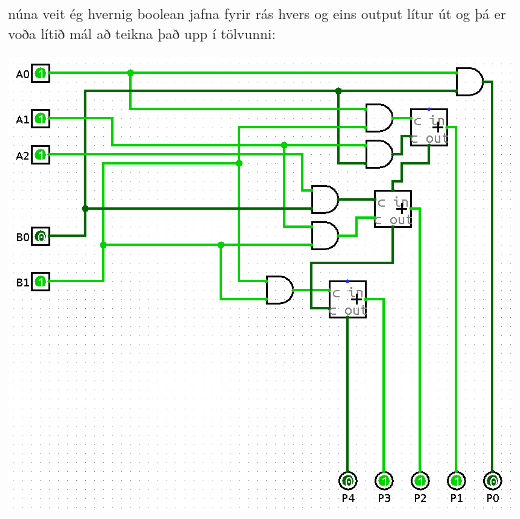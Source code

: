 \documentclass{article}
\begin{document}
núna veit ég hvernig boolean jafna fyrir rás hvers og eins output lítur út og þá er voða lítið mál að teikna það upp í tölvunni:
\begin{center}
    \includegraphics[scale=0.4]{imgs/Screenshot from 2022-03-11 10-51-59.png}
\end{center}
\end{document}
